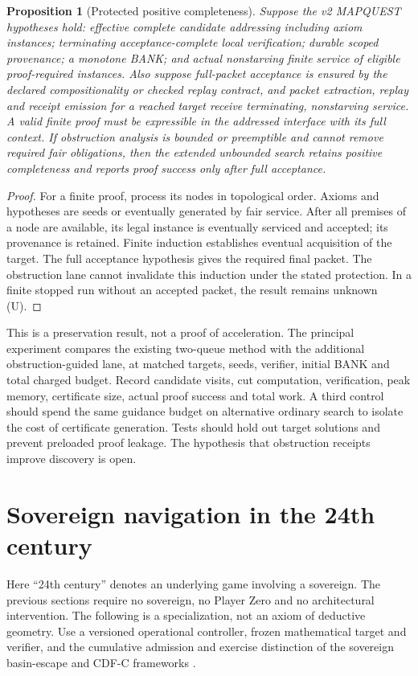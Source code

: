 \documentclass[11pt]{article}
\newtheorem{proposition}[theorem]{Proposition}
\theoremstyle{remark}\newtheorem{remark}[theorem]{Remark}
\begin{document}
\begin{proposition}[Protected positive completeness]\label{thm:fair}
Suppose the v2 MAPQUEST hypotheses hold: effective complete candidate addressing including axiom instances; terminating acceptance-complete local verification; durable scoped provenance; a monotone BANK; and actual nonstarving finite service of eligible proof-required instances. Also suppose full-packet acceptance is ensured by the declared compositionality or checked replay contract, and packet extraction, replay and receipt emission for a reached target receive terminating, nonstarving service. A valid finite proof must be expressible in the addressed interface with its full context. If obstruction analysis is bounded or preemptible and cannot remove required fair obligations, then the extended unbounded search retains positive completeness and reports proof success only after full acceptance.
\end{proposition}
\begin{proof}
For a finite proof, process its nodes in topological order. Axioms and hypotheses are seeds or eventually generated by fair service. After all premises of a node are available, its legal instance is eventually serviced and accepted; its provenance is retained. Finite induction establishes eventual acquisition of the target. The full acceptance hypothesis gives the required final packet. The obstruction lane cannot invalidate this induction under the stated protection. In a finite stopped run without an accepted packet, the result remains unknown (U).
\end{proof}
This is a preservation result, not a proof of acceleration. The principal experiment compares the existing two-queue method with the additional obstruction-guided lane, at matched targets, seeds, verifier, initial BANK and total charged budget. Record candidate visits, cut computation, verification, peak memory, certificate size, actual proof success and total work. A third control should spend the same guidance budget on alternative ordinary search to isolate the cost of certificate generation. Tests should hold out target solutions and prevent preloaded proof leakage. The hypothesis that obstruction receipts improve discovery is open.

\section{Sovereign navigation in the 24th century}
Here ``24th century'' denotes an underlying game involving a sovereign. The previous sections require no sovereign, no Player Zero and no architectural intervention. The following is a specialization, not an axiom of deductive geometry. Use a versioned operational controller, frozen mathematical target and verifier, and the cumulative admission and exercise distinction of the sovereign basin-escape and CDF-C frameworks \cite{basin,cdf}.
\end{document}
